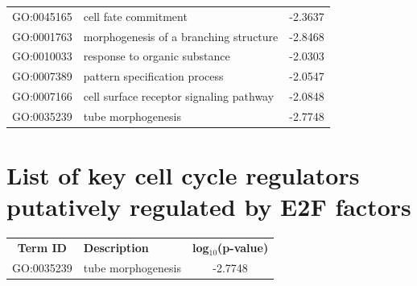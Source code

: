 \documentclass[11pt,twoside,a4paper]{report}
\begin{document}
\begin{appendices}
\begin{longtable}{@{\extracolsep{\fill}}llc@{}}
    GO:0045165 & cell fate commitment                                        & -2.3637       \\
    GO:0001763 & morphogenesis of a branching structure                      & -2.8468       \\
    GO:0010033 & response to organic substance                               & -2.0303       \\
    GO:0007389 & pattern specification process                               & -2.0547       \\
    GO:0007166 & cell surface receptor signaling pathway                     & -2.0848       \\
    GO:0035239 & tube morphogenesis                                          & -2.7748       \\
	\end{longtable}
    
	\chapter{List of key cell cycle regulators putatively regulated by E2F factors}	
	\label{list_key_cell_cycle_regulators}
	
	\footnotesize  %
	\begin{longtable}{@{\extracolsep{\fill}}clc@{}}
	\textbf{Term ID}  & \textbf{Description}                                 & \textbf{log$_{10}$(p-value)} \\
	GO:0035239 & tube morphogenesis                                          & -2.7748       \\
	\end{longtable}

\end{appendices}
\end{document}
